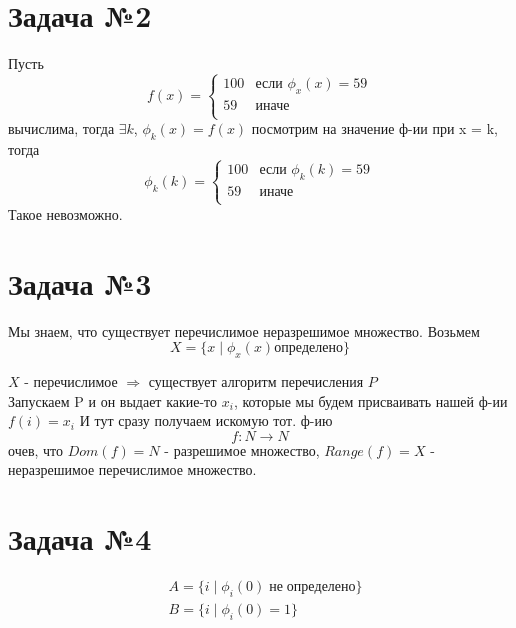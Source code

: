 \documentclass[a4paper,12pt]{article} %
\begin{document}
\newpage
\section*{Задача №2}

Пусть 
\begin{equation*}
    f(x) = 
    \begin{cases}
       100 &\text{если } \phi_x(x) = 59\\
       59  & \text{иначе } \\
    \end{cases}
\end{equation*}
вычислима, тогда $\exists k$, $\phi_k(x) = f(x)$ посмотрим на значение ф-ии при 
x = k, тогда 
\begin{equation*}
    \phi_k(k) = 
    \begin{cases}
       100 &\text{если } \phi_k(k) = 59\\
       59  & \text{иначе } \\
    \end{cases}
\end{equation*}
Такое невозможно.


 
\section*{Задача №3}
Мы знаем, что существует перечислимое неразрешимое множество.
Возьмем 
\begin{equation*}
    X = \{x \;| \;\phi_x(x) определено\}  
\end{equation*}

\noindent$X$ - перечислимое $\Rightarrow$ существует алгоритм перечисления $P$\\
Запускаем P и он выдает какие-то $x_i$, которые мы будем присваивать нашей ф-ии $f(i) = x_i$
И тут сразу получаем искомую тот. ф-ию 
\[f:N \rightarrow N\]
очев, что $Dom(f) = N$ - разрешимое множество, $Range(f) = X$  - неразрешимое перечислимое множество.


\section*{Задача №4}
\begin{align*}
    &A = \{i \; | \; \phi_i(0) \; не \; определено\} \\
    &B = \{i \; | \; \phi_i(0) = 1\}
\end{align*}

 
\end{document}
